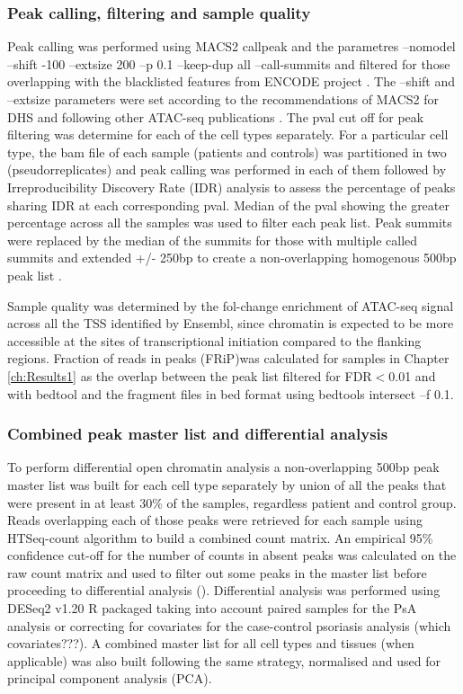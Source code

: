 \subsubsection{Peak calling, filtering and sample quality}
Peak calling was performed using MACS2  callpeak \parencite{} and the parametres --nomodel --shift -100 --extsize 200 --p 0.1 --keep-dup all --call-summits and filtered for those overlapping with the blacklisted features from ENCODE project \parencite{}. The --shift and --extsize parameters were set according to the recommendations of MACS2 for DHS and following other ATAC-seq publications \parencite{Buenrostro2015, Corces2016}. The pval cut off for peak filtering was determine for each of the cell types separately. 
For a particular cell type, the bam file of each sample (patients and controls) was partitioned in two (pseudorreplicates) and peak calling was performed in each of them followed by Irreproducibility Discovery Rate (IDR) analysis to assess the percentage of peaks sharing IDR at each corresponding pval. Median of the pval showing the greater percentage across all the samples was used to filter each peak list. Peak summits were replaced by the median of the summits for those with multiple called summits and extended +/- 250bp to create a non-overlapping homogenous 500bp peak list \parencite{Buenrostro2015, Corces2016}. 

Sample quality was determined by the fol-change enrichment of ATAC-seq signal across all the TSS identified by Ensembl, since chromatin is expected to be more accessible at the sites of transcriptional initiation compared to the flanking regions. Fraction of reads in peaks (FRiP)was calculated for samples in Chapter \ref{ch:Results1} as the overlap between the peak list filtered for FDR$<$0.01 and with bedtool and the fragment files in bed format using bedtools intersect --f 0.1.

\subsubsection{Combined peak master list and differential analysis}
To perform differential open chromatin analysis a non-overlapping 500bp peak master list was built for each cell type separately by union of all the peaks that were present in at least 30\% of the samples, regardless patient and control group. Reads overlapping each of those peaks were retrieved for each sample using HTSeq-count algorithm \parencite{} to build a combined count matrix. An empirical 95\% confidence cut-off for the number of counts in absent peaks was calculated on the raw count matrix and used to filter out some peaks in the master list before proceeding to differential analysis (\parencite{Xinmin2005,Jonker2014}). Differential analysis was performed using DESeq2 v1.20 R packaged taking into account paired samples for the PsA analysis or correcting for covariates for the case-control psoriasis analysis (which covariates???)\parencite{Love2014}.
A combined master list for all cell types and tissues (when applicable) was also built following the same strategy, normalised and used for principal component analysis (PCA). 



